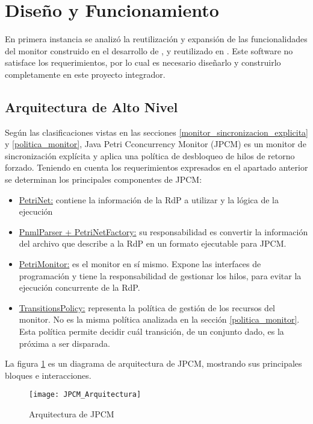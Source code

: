 \section{Diseño y Funcionamiento}

En primera instancia se analizó la reutilización y expansión de las
funcionalidades del monitor construido en el desarrollo de \cite{codegen}, y
reutilizado en \cite{chimp}. Este software no satisface los requerimientos, por
lo cual es necesario diseñarlo y construirlo completamente en este proyecto
integrador.

\subsection{Arquitectura de Alto Nivel}
\label{JPCM_arq_alto_nivel}

Según las clasificaciones vistas en las secciones
\ref{monitor_sincronizacion_explicita} y \ref{politica_monitor}, Java Petri
Cconcurrency Monitor (JPCM) es un monitor de sincronización explícita y aplica
una política de desbloqueo de hilos de retorno forzado. Teniendo en cuenta los
requerimientos expresados en el apartado anterior se determinan los principales
componentes de JPCM:
\begin{itemize}
  \item \underline{PetriNet:} contiene la información de la RdP a utilizar y la
  lógica de la ejecución
  \item \underline{PnmlParser + PetriNetFactory:} su responsabilidad es
  convertir la información del archivo que describe a la RdP en un formato
  ejecutable para JPCM.
  \item \underline{PetriMonitor:} es el monitor en sí mismo. Expone las
  interfaces de programación y tiene la responsabilidad de gestionar los hilos,
  para evitar la ejecución concurrente de la RdP.
  \item \underline{TransitionsPolicy:} representa la política de gestión de los
  recursos del monitor. No es la misma política analizada en la sección
  \ref{politica_monitor}. Esta política permite decidir cuál transición, de un
  conjunto dado, es la próxima a ser disparada.
\end{itemize}

La figura \ref{fig:JPCM_Arquitectura} es un diagrama de arquitectura de JPCM,
mostrando sus principales bloques e interacciones.

\begin{figure}[H]
  \centering
  \texttt{[image: JPCM\_Arquitectura]}
  \caption{Arquitectura de JPCM}
  \label{fig:JPCM_Arquitectura}
\end{figure}

